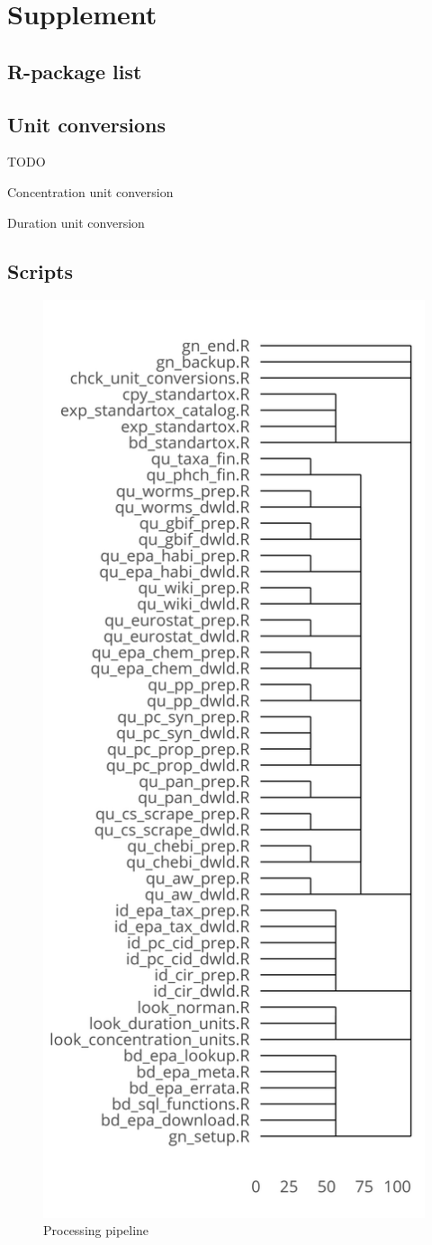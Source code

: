 \section*{Supplement}

\subsection*{R-package list}
\label{list:r-packages}


\subsection*{Unit conversions}
 TODO
\begin{table}
    \caption{Concentration unit conversion}
    \label{sup:conv-concentration}
\end{table}


\begin{table}
    \caption{Duration unit conversion}
    \label{sup:conv-duration}
\end{table}


\pagebreak


%

%


\subsection*{Scripts}
\begin{figure}
    \includegraphics[width=0.5\linewidth]{article/figures/scripts_dendrogram.png}
    \caption{Processing pipeline}
    \label{fig:pipeline-tree}
\end{figure}



